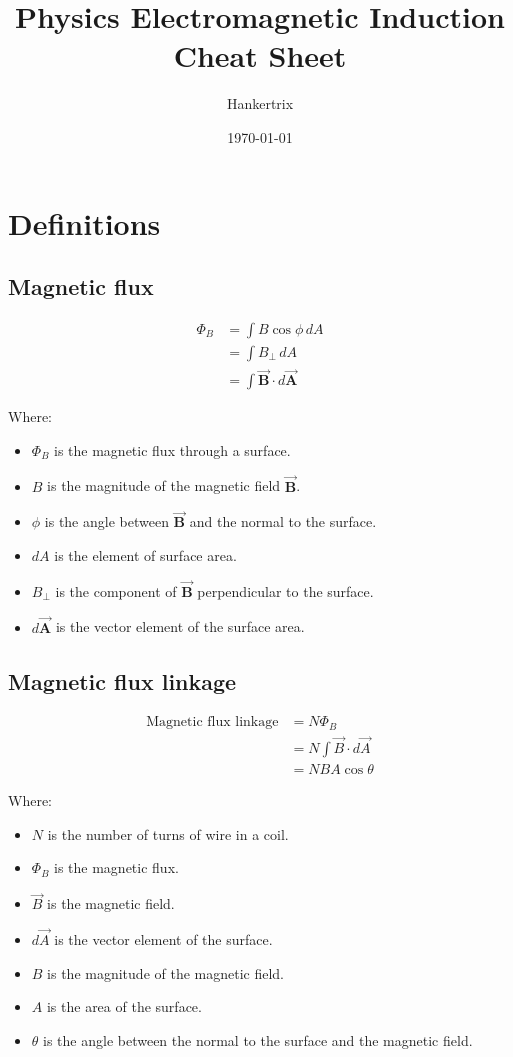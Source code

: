 \documentclass[11pt]{article}
\author{Hankertrix}
\date{\today}
\title{Physics Electromagnetic Induction Cheat Sheet}
\begin{document}
\maketitle
\setcounter{tocdepth}{2}
\tableofcontents \clearpage
\section{Definitions}
\label{sec:org83489d0}

\subsection{Magnetic flux}
\label{sec:orga499ff5}
\begin{align*}
\Phi_B &= \int B \cos \phi \, dA \\
&= \int B_{\perp} \, dA \\
&= \int \vec{\boldsymbol{B}} \cdot d \vec{\boldsymbol{A}}
\end{align*}

Where:
\begin{itemize}
\item \(\Phi_B\) is the magnetic flux through a surface.
\item \(B\) is the magnitude of the magnetic field \(\vec{\boldsymbol{B}}\).
\item \(\phi\) is the angle between \(\vec{\boldsymbol{B}}\) and the normal to the surface.
\item \(dA\) is the element of surface area.
\item \(B_{\perp}\) is the component of \(\vec{\boldsymbol{B}}\) perpendicular to the surface.
\item \(d \vec{\boldsymbol{A}}\) is the vector element of the surface area.
\end{itemize}

\subsection{Magnetic flux linkage}
\label{sec:org11830fb}
\begin{align*}
\text{Magnetic flux linkage} &= N \Phi_B \\
&= N \int \vec{B} \cdot d \vec{A} \\
&= NBA \cos \theta
\end{align*}

Where:
\begin{itemize}
\item \(N\) is the number of turns of wire in a coil.
\item \(\Phi_B\) is the magnetic flux.
\item \(\vec{B}\) is the magnetic field.
\item \(d \vec{A}\) is the vector element of the surface.
\item \(B\) is the magnitude of the magnetic field.
\item \(A\) is the area of the surface.
\item \(\theta\) is the angle between the normal to the surface and the magnetic field.
\end{itemize}
\end{document}
